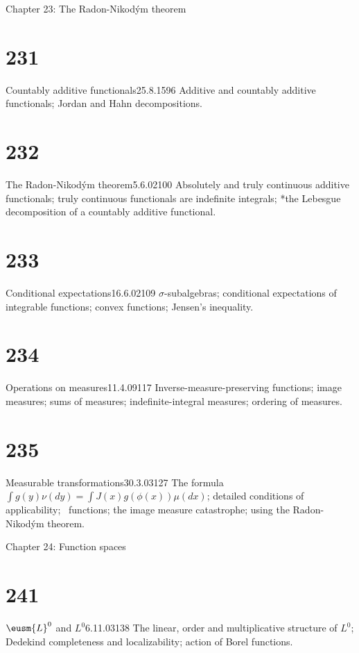 
 Chapter 23: The Radon-Nikod\'ym theorem


\section{231}{Countably additive functionals}{25.8.15}{96}{}
{Additive and countably additive functionals;  Jordan and Hahn
decompositions.}

\section{232}{The Radon-Nikod\'ym theorem}{5.6.02}{100}{}
{Absolutely and truly continuous additive functionals;  truly
continuous functionals are indefinite integrals;  *the Lebesgue
decomposition of a countably additive functional.}

\section{233}{Conditional expectations}{16.6.02}{109}{}
{$\sigma$-subalgebras;  conditional expectations of integrable
functions;  convex functions;  Jensen's inequality.}

\section{234}{Operations on measures}{11.4.09}{117}{}
{Inverse-measure-preserving functions;  image measures;  sums of measures;
indefinite-integral measures;  ordering of measures.}

\section{235}{Measurable transformations}{30.3.03}{127}{}
{The formula ${\int}g(y)\nu(dy)={\int}J(x)g(\phi(x))\mu(dx)$;
detailed conditions of applicability;  \imp\ functions;  the image
measure catastrophe;  using the Radon-Nikod\'ym theorem.}


 Chapter 24:  Function spaces


\section{241}{$\eusm{L}^0$ and $L^0$}{6.11.03}{138}{}
{The linear, order and multiplicative structure of $L^0$;  Dedekind completeness and localizability;  action
of Borel functions.}

